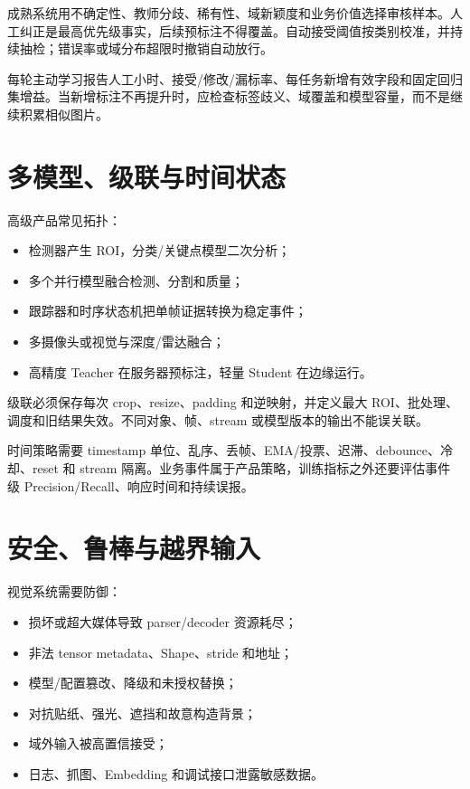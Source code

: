 成熟系统用不确定性、教师分歧、稀有性、域新颖度和业务价值选择审核样本。人工纠正是最高优先级事实，后续预标注不得覆盖。自动接受阈值按类别校准，并持续抽检；错误率或域分布超限时撤销自动放行。

每轮主动学习报告人工小时、接受/修改/漏标率、每任务新增有效字段和固定回归集增益。当新增标注不再提升时，应检查标签歧义、域覆盖和模型容量，而不是继续积累相似图片。

\section{多模型、级联与时间状态}

高级产品常见拓扑：

\begin{itemize}
  \item 检测器产生 ROI，分类/关键点模型二次分析；
  \item 多个并行模型融合检测、分割和质量；
  \item 跟踪器和时序状态机把单帧证据转换为稳定事件；
  \item 多摄像头或视觉与深度/雷达融合；
  \item 高精度 Teacher 在服务器预标注，轻量 Student 在边缘运行。
\end{itemize}

级联必须保存每次 crop、resize、padding 和逆映射，并定义最大 ROI、批处理、调度和旧结果失效。不同对象、帧、stream 或模型版本的输出不能误关联。

时间策略需要 timestamp 单位、乱序、丢帧、EMA/投票、迟滞、debounce、冷却、reset 和 stream 隔离。业务事件属于产品策略，训练指标之外还要评估事件级 Precision/Recall、响应时间和持续误报。

\section{安全、鲁棒与越界输入}

视觉系统需要防御：

\begin{itemize}
  \item 损坏或超大媒体导致 parser/decoder 资源耗尽；
  \item 非法 tensor metadata、Shape、stride 和地址；
  \item 模型/配置篡改、降级和未授权替换；
  \item 对抗贴纸、强光、遮挡和故意构造背景；
  \item 域外输入被高置信接受；
  \item 日志、抓图、Embedding 和调试接口泄露敏感数据。
\end{itemize}

